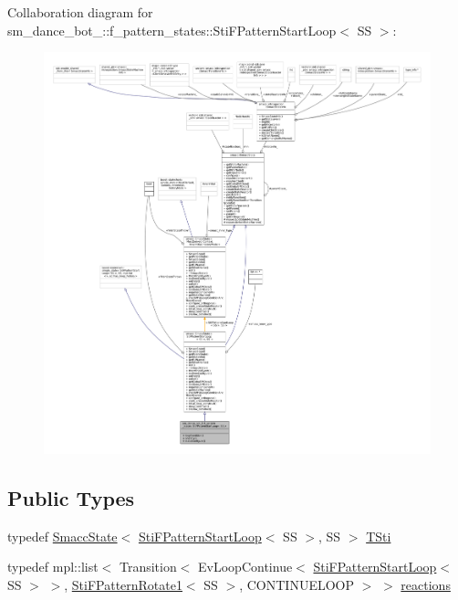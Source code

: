 Collaboration diagram for sm\+\_\+dance\+\_\+bot\+\_\+:\+:f\+\_\+pattern\+\_\+states\+:\+:Sti\+F\+Pattern\+Start\+Loop$<$ SS $>$\+:
\nopagebreak
\begin{figure}[H]
\begin{center}
\leavevmode
\includegraphics[width=350pt]{structsm__dance__bot__3_1_1f__pattern__states_1_1StiFPatternStartLoop__coll__graph}
\end{center}
\end{figure}
\subsection*{Public Types}
\begin{DoxyCompactItemize}
\item 
typedef \hyperlink{classSmaccState}{Smacc\+State}$<$ \hyperlink{structsm__dance__bot__3_1_1f__pattern__states_1_1StiFPatternStartLoop}{Sti\+F\+Pattern\+Start\+Loop}$<$ SS $>$, SS $>$ \hyperlink{structsm__dance__bot__3_1_1f__pattern__states_1_1StiFPatternStartLoop_abae524faa7da7b75f61278dd49267206}{T\+Sti}
\item 
typedef mpl\+::list$<$ Transition$<$ Ev\+Loop\+Continue$<$ \hyperlink{structsm__dance__bot__3_1_1f__pattern__states_1_1StiFPatternStartLoop}{Sti\+F\+Pattern\+Start\+Loop}$<$ SS $>$ $>$, \hyperlink{structsm__dance__bot__3_1_1f__pattern__states_1_1StiFPatternRotate1}{Sti\+F\+Pattern\+Rotate1}$<$ SS $>$, C\+O\+N\+T\+I\+N\+U\+E\+L\+O\+OP $>$ $>$ \hyperlink{structsm__dance__bot__3_1_1f__pattern__states_1_1StiFPatternStartLoop_a8a5de71794609b0e16f480f8fc674b43}{reactions}
\end{DoxyCompactItemize}
